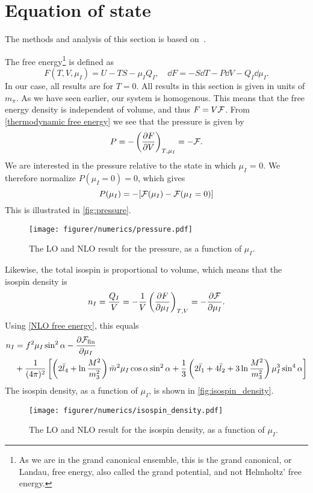 \section{Equation of state}
The methods and analysis of this section is based on~\cite{Peskin:IntroQFT,Andersen:two-flavor-chpt,andersen2012introduction}.

The free energy\footnote{As we are in the grand canonical ensemble, this is the grand canonical, or Landau, free energy, also called the grand potential, and not Helmholtz' free energy.}
is defined as
\begin{equation}
    \label{thermodynamic free energy}
    F(T, V, \mu_I) = U - TS - \mu_I Q_I, 
    \quad \dd 
    F = - S \dd T - P \dd V - Q_I \dd \mu_I.
\end{equation}
In our case, all results are for $T = 0$.
All results in this section is given in units of $m_\pi$.
As we have seen earlier, our system is homogenous.
This means that the free energy density is independent of volume, and thus $F = V \mathcal{F}$.
From  \cref{thermodynamic free energy} we see that the pressure is given by
\begin{equation}
    P = - \left(\diffp{F}{V}\right)_{T, \mu_I} = - \Ef.
\end{equation}
We are interested in the pressure relative to the state in which $\mu_I$ = 0. We therefore normalize $P(\mu_I=0) = 0$, which gives  
\begin{equation}
    P(\mu_I) = -[\mathcal{F}(\mu_I) - \mathcal{F}(\mu_I = 0)]
\end{equation}
This is illustrated in \autoref{fig:pressure}.
\begin{figure}[h]
    \centering
    \vspace{-0.2cm}
    \texttt{[image: figurer/numerics/pressure.pdf]}
    \caption{The LO and NLO result for the pressure, as a function of $\mu_I$.}
    \label{fig:pressure}
\end{figure}

Likewise, the total isospin is proportional to volume, which means that the isospin density is
\begin{equation}
    n_I = \frac{Q_I}{V} = - \frac{1}{V} \left(\diffp{F}{\mu_I}\right)_{T, V}
    = - \diffp{\Ef}{\mu_I}.
\end{equation}
Using \cref{NLO free energy}, this equals
\begin{align}
    \nonumber
    n_I & = 
    f^2 \mu_I \sin^2 \alpha
    - \diffp{\Ef_\mathrm{fin}}{\mu_I} \\
    & + \frac{1}{(4 \pi)^2}
    \left[
            \left(2\bar l_4+\ln\frac{M^2}{m_3^2}\right)\bar m^2 \mu_I \cos\alpha \sin^2 \alpha
            +\frac{1}{3}\left(2\bar l_1 + 4 \bar l_2 + 3\ln\frac{M^2}{m_3^2}\right)\mu_I^3 \sin^4 \alpha
    \right]
\end{align}
The isospin density, as a function of $\mu_I$, is shown in \autoref{fig:isospin_density}.
\begin{figure}[h]
    \centering
    \vspace{-0.2cm}
    \texttt{[image: figurer/numerics/isospin\_density.pdf]}
    \caption{The LO and NLO result for the isospin density, as a function of $\mu_I$.}
    \label{fig:isospin_density}
\end{figure}

